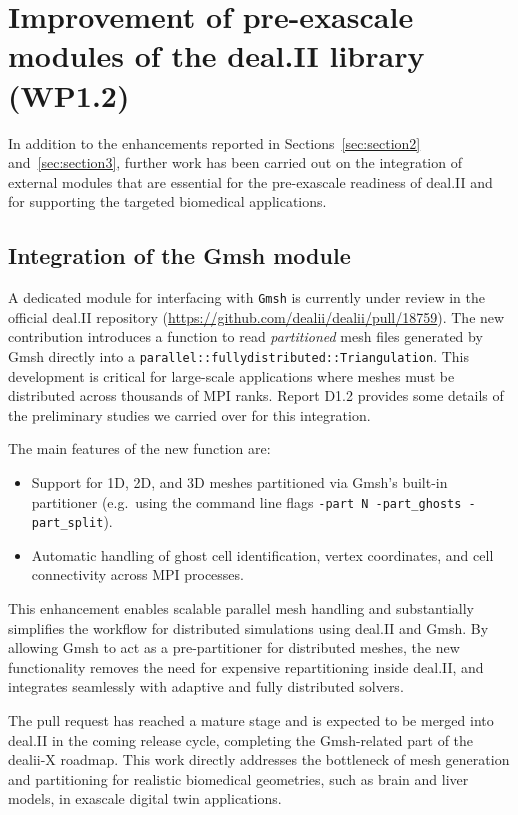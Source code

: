 \documentclass[a4paper,12pt]{article}
\begin{document}
\section{Improvement of pre-exascale modules of the deal.II library (WP1.2)}

In addition to the enhancements reported in Sections~\ref{sec:section2} and~\ref{sec:section3},
further work has been carried out on the integration of external modules that are
essential for the pre-exascale readiness of deal.II and for supporting the
targeted biomedical applications.

\subsection{Integration of the Gmsh module}

A dedicated module for interfacing with \texttt{Gmsh} is currently under
review in the official deal.II repository
(\url{https://github.com/dealii/dealii/pull/18759}).  
The new contribution introduces a function to read \emph{partitioned} mesh files
generated by Gmsh directly into a \texttt{parallel::fullydistributed::Triangulation}.
This development is critical for large-scale applications where meshes must be
distributed across thousands of MPI ranks. Report D1.2 provides some details of the preliminary studies we carried over for this integration.

The main features of the new function are:
\begin{itemize}
  \item Support for 1D, 2D, and 3D meshes partitioned via Gmsh's built-in
        partitioner (e.g.\ using the command line flags
        \verb|-part N -part_ghosts -part_split|).
  \item Automatic handling of ghost cell identification, vertex coordinates,
        and cell connectivity across MPI processes.
\end{itemize}

This enhancement enables scalable parallel mesh handling and substantially
simplifies the workflow for distributed simulations using deal.II and Gmsh.
By allowing Gmsh to act as a pre-partitioner for distributed meshes, the new
functionality removes the need for expensive repartitioning inside deal.II,
and integrates seamlessly with adaptive and fully distributed solvers.  

The pull request has reached a mature stage and is expected to be merged into
deal.II in the coming release cycle, completing the Gmsh-related part of the
dealii-X roadmap. This work directly addresses the bottleneck of mesh generation
and partitioning for realistic biomedical geometries, such as brain and liver
models, in exascale digital twin applications.
\end{document}
